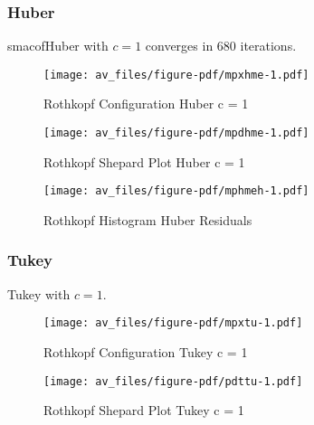 \documentclass[
  12pt,
  letterpaper,
  DIV=11,
  numbers=noendperiod]{scrartcl}
\theoremstyle{plain}
\theoremstyle{plain}
\theoremstyle{plain}
\theoremstyle{definition}
\theoremstyle{remark}
\begin{document}
\subsubsection{Huber}\label{huber-2}

smacofHuber with \(c=1\) converges in 680 iterations.

\begin{figure}[H]

{\centering \texttt{[image: av\_files/figure-pdf/mpxhme-1.pdf]}

}

\caption{Rothkopf Configuration Huber c = 1}

\end{figure}%

\begin{figure}[H]

{\centering \texttt{[image: av\_files/figure-pdf/mpdhme-1.pdf]}

}

\caption{Rothkopf Shepard Plot Huber c = 1}

\end{figure}%

\begin{figure}[H]

{\centering \texttt{[image: av\_files/figure-pdf/mphmeh-1.pdf]}

}

\caption{Rothkopf Histogram Huber Residuals}

\end{figure}%

\subsubsection{Tukey}\label{tukey-2}

Tukey with \(c=1\).

\begin{figure}[H]

{\centering \texttt{[image: av\_files/figure-pdf/mpxtu-1.pdf]}

}

\caption{Rothkopf Configuration Tukey c = 1}

\end{figure}%

\begin{figure}[H]

{\centering \texttt{[image: av\_files/figure-pdf/pdttu-1.pdf]}

}

\caption{Rothkopf Shepard Plot Tukey c = 1}

\end{figure}%
\end{document}
